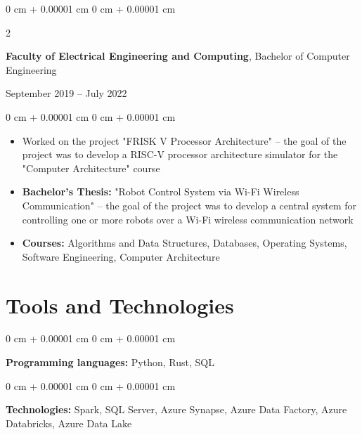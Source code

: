 \documentclass[10pt, letterpaper]{article}
\newenvironment{highlights}{
    \begin{itemize}[
        topsep=0.10 cm,
        parsep=0.10 cm,
        partopsep=0pt,
        itemsep=0pt,
        leftmargin=0 cm + 10pt
    ]
}{
    \end{itemize}
} %
\newenvironment{onecolentry}{
    \begin{adjustwidth}{
        0 cm + 0.00001 cm
    }{
        0 cm + 0.00001 cm
    }
}{
    \end{adjustwidth}
} %
\newenvironment{twocolentry}[2][]{
    \onecolentry
    \def\secondColumn{#2}
    \setcolumnwidth{\fill, 4.5 cm}
    \begin{paracol}{2}
}{
    \switchcolumn \raggedleft \secondColumn
    \end{paracol}
    \endonecolentry
} %
\begin{document}
        \begin{twocolentry}{
            September 2019 – July 2022
            }
            \textbf{Faculty of Electrical Engineering and Computing}, Bachelor of Computer Engineering
        \end{twocolentry}
            
            \vspace{0.10 cm}
        \begin{onecolentry}
            \begin{highlights}
                \item Worked on the project "FRISK V Processor Architecture" – the goal of the project was to develop a RISC-V processor architecture simulator for the "Computer Architecture" course
                \item \textbf{Bachelor's Thesis:} "Robot Control System via Wi-Fi Wireless Communication" – the goal of the project was to develop a central system for controlling one or more robots over a Wi-Fi wireless communication network
                \item \textbf{Courses:} Algorithms and Data Structures, Databases, Operating Systems, Software Engineering, Computer Architecture
            \end{highlights}
        \end{onecolentry}

    
    \section{Tools and Technologies}



        
        \begin{onecolentry}
            \textbf{Programming languages:} Python, Rust, SQL
        \end{onecolentry}

        \vspace{0.2 cm}

        \begin{onecolentry}
            \textbf{Technologies:} Spark, SQL Server, Azure Synapse, Azure Data Factory, Azure Databricks, Azure Data Lake
        \end{onecolentry}

    
    
\end{document}

